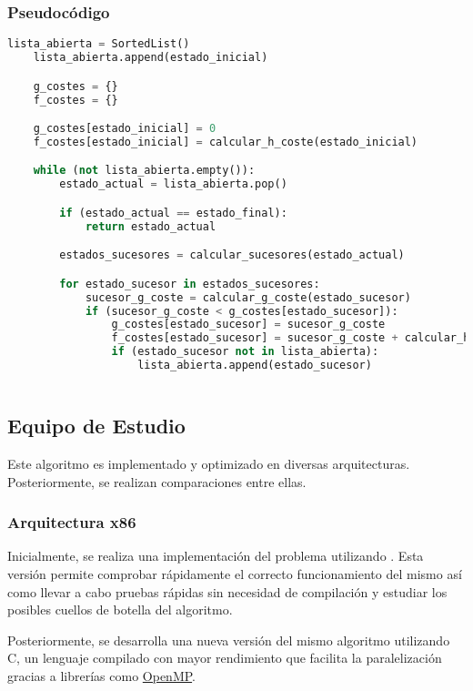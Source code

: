 \subsubsection{Pseudocódigo}

\begin{lstlisting}[language=Python]
    lista_abierta = SortedList()
    lista_abierta.append(estado_inicial)

    g_costes = {}
    f_costes = {}

    g_costes[estado_inicial] = 0
    f_costes[estado_inicial] = calcular_h_coste(estado_inicial)

    while (not lista_abierta.empty()):
        estado_actual = lista_abierta.pop()

        if (estado_actual == estado_final):
            return estado_actual

        estados_sucesores = calcular_sucesores(estado_actual)

        for estado_sucesor in estados_sucesores:
            sucesor_g_coste = calcular_g_coste(estado_sucesor)
            if (sucesor_g_coste < g_costes[estado_sucesor]):
                g_costes[estado_sucesor] = sucesor_g_coste
                f_costes[estado_sucesor] = sucesor_g_coste + calcular_h_coste(estado_sucesor)
                if (estado_sucesor not in lista_abierta):
                    lista_abierta.append(estado_sucesor)
            
\end{lstlisting}

\subsection{Equipo de Estudio}

Este algoritmo es implementado y optimizado en diversas arquitecturas.
Posteriormente, se realizan comparaciones entre ellas.

\subsubsection{Arquitectura x86}

Inicialmente, se realiza una implementación del problema utilizando \Python.
Esta versión permite comprobar rápidamente el correcto funcionamiento del mismo
así como llevar a cabo pruebas rápidas sin necesidad de compilación y
estudiar los posibles cuellos de botella del algoritmo.

Posteriormente, se desarrolla una nueva versión del mismo algoritmo
utilizando C, un lenguaje compilado con mayor rendimiento
que facilita la paralelización gracias a librerías como 
\href{https://www.openmp.org/}{OpenMP}\@.

